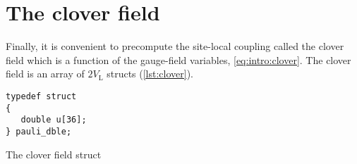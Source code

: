 \section{The clover field}
\label{sec:openqxd:clover:field}

Finally, it is convenient to precompute the site-local coupling called the clover field which is a function of the gauge-field variables, \cref{eq:intro:clover}.
The clover field is an array of $2V_\mathrm{L}$  structs (\cref{lst:clover}).
\begin{codelisting}
\begin{verbatim}
typedef struct
{
   double u[36];
} pauli_dble;
\end{verbatim}
\caption{The clover field struct}
\label{lst:clover}
\end{codelisting}

